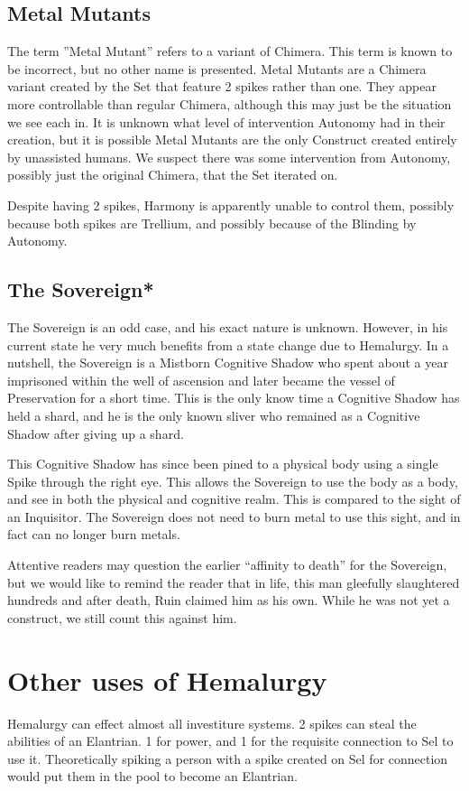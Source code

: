 \documentclass[conference]{IEEEtran}
\newcommand{\n}{\hfill\break}
\begin{document}
\subsection*{\textbf{Metal Mutants}}
The term ''Metal Mutant'' refers to a variant of Chimera.\cite{TLM-CH56}  This term is known to be incorrect, but no other name is presented.  Metal Mutants are a Chimera variant created by the Set that feature 2 spikes rather than one.\cite{TLM-CH55}  They appear more controllable than regular Chimera, although this may just be the situation we see each in.  It is unknown what level of intervention Autonomy had in their creation, but it is possible Metal Mutants are the only Construct created entirely by unassisted humans.  We suspect there was some intervention from Autonomy, possibly just the original Chimera, that the Set iterated on.

Despite having 2 spikes, Harmony is apparently unable to control them, possibly because both spikes are Trellium, and possibly because of the Blinding by Autonomy.

\subsection*{\textbf{The Sovereign}*} The Sovereign is an odd case, and his exact nature is unknown.  However, in his current state he very much benefits from a state change due to Hemalurgy.  In a nutshell, the Sovereign is a Mistborn Cognitive Shadow who spent about a year imprisoned within the well of ascension and later became the vessel of Preservation for a short time.\cite{SH}  This is the only know time a Cognitive Shadow has held a shard, and he is the only known sliver who remained as a Cognitive Shadow after giving up a shard. 

This Cognitive Shadow has since been pined to a physical body using a single Spike through the right eye. This allows the Sovereign to use the body as a body, and see in both the physical and cognitive realm.  This is compared to the sight of an Inquisitor.  The Sovereign does not need to burn metal to use this sight, and in fact can no longer burn metals.\cite{TLM-3WAD} 

Attentive readers may question the earlier ``affinity to death'' for the Sovereign, but we would like to remind the reader that in life, this man gleefully slaughtered hundreds\cite{TFE-CH5} and after death, Ruin claimed him as his own.\cite{SH-PT3-CH3}  While he was not yet a construct, we still count this against him.\n
\section{\textbf{Other uses of Hemalurgy}}
Hemalurgy can effect almost all investiture systems.\cite{HE-universal}  2 spikes can steal the abilities of an Elantrian.  1 for power, and 1 for the requisite connection to Sel to use it.\cite{HE-elantrian}  Theoretically spiking a person with a spike created on Sel for connection would put them in the pool to become an Elantrian.\cite{HE-pool}
\end{document}
